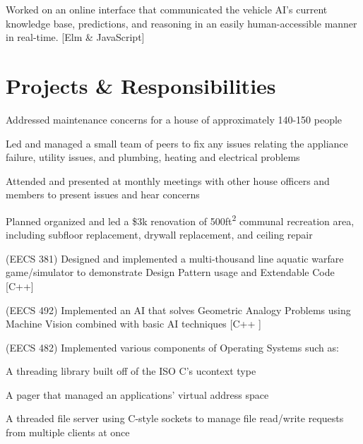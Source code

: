 \documentclass[letterpaper]{headers} %
\begin{document}
\begin{minipage}[t]{0.66\textwidth}
	\sectionspace
	
	\begin{tightitemize}
		\item Worked on an online interface that communicated the vehicle AI's current knowledge base, predictions, and reasoning in an easily human-accessible manner in real-time. [Elm \& JavaScript]
	\end{tightitemize}

\sectionspace

\section{Projects \& Responsibilities}
	\begin{tightitemize}
		\item Addressed maintenance concerns for a house of approximately 140-150 people
		\item Led and managed a small team of peers to fix any issues relating the appliance failure, utility issues, and plumbing, heating and electrical problems
		\item Attended and presented at monthly meetings with other house officers and members to present issues and hear concerns
		\item Planned organized and led a \$3k renovation of 500ft\textsuperscript{2} communal recreation area, including subfloor replacement, drywall replacement, and ceiling repair
	\end{tightitemize}
	
	\sectionspace
	
	\begin{tightitemize}
		\item (EECS 381) Designed and implemented a multi-thousand line aquatic warfare game/simulator to demonstrate Design Pattern usage and Extendable Code [C++]
		\item (EECS 492) Implemented an AI that solves Geometric Analogy Problems using Machine Vision combined with basic AI techniques [C++ ]
		\item (EECS 482) Implemented various components of Operating Systems such as:\\
		\begin{tightitemize}
			\item A threading library built off of the ISO C's ucontext type
			\item A pager that managed an applications' virtual address space
			\item A threaded file server using C-style sockets to manage file read/write requests from multiple clients at once
		\end{tightitemize}
	\end{tightitemize}

\end{minipage}
\end{document}
